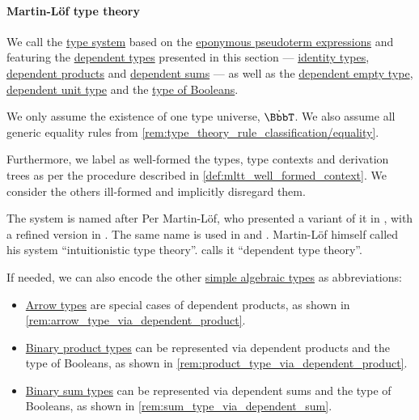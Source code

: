 \paragraph{Martin-L\"of type theory}

\begin{definition}\label{def:mltt}\mimprovised
  We call  the \hyperref[def:abstract_type_system]{type system} based on the \hyperref[def:mltt_pseudoterm]{eponymous pseudoterm expressions} and featuring the \hyperref[con:dependent_type]{dependent types} presented in this section --- \hyperref[def:identity_type]{identity types}, \hyperref[def:dependent_product]{dependent products} and \hyperref[def:dependent_sum]{dependent sums} --- as well as the \hyperref[def:dependent_empty_type]{dependent empty type}, \hyperref[def:dependent_unit_type]{dependent unit type} and the \hyperref[def:type_of_booleans]{type of Booleans}.

  We only assume the existence of one type universe, \( \syn\BbbT \). We also assume all generic equality rules from \cref{rem:type_theory_rule_classification/equality}.

  Furthermore, we label as well-formed the types, type contexts and derivation trees as per the procedure described in \cref{def:mltt_well_formed_context}. We consider the others ill-formed and implicitly disregard them.
\end{definition}
\begin{comments}
  \item The system is named after Per Martin-L\"of, who presented a variant of it in \cite{MartinLöf1975IntuitionisticTypeTheory}, with a refined version in \cite{MartinLöf1984IntuitionisticTypeTheory}. The same name is used in \cite{UnivalentFoundationsProgram2024OctoberHoTT} and \cite[ch. 8]{Mimram2020ProgramEqualsProof}. Martin-L\"of himself called his system \enquote{intuitionistic type theory}. \cite[ch. 8]{Mimram2020ProgramEqualsProof} calls it \enquote{dependent type theory}.

  \item If needed, we can also encode the other \hyperref[def:simple_algebraic_types]{simple algebraic types} as abbreviations:
  \begin{itemize}
    \item \hyperref[def:arrow_type]{Arrow types} are special cases of dependent products, as shown in \cref{rem:arrow_type_via_dependent_product}.
    \item \hyperref[def:simple_product_type]{Binary product types} can be represented via dependent products and the type of Booleans, as shown in \cref{rem:product_type_via_dependent_product}.
    \item \hyperref[def:simple_sum_type]{Binary sum types} can be represented via dependent sums and the type of Booleans, as shown in \cref{rem:sum_type_via_dependent_sum}.
  \end{itemize}
\end{comments}

